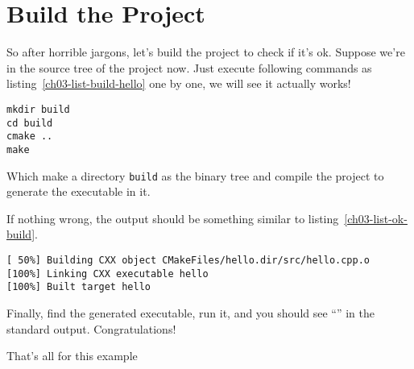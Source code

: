 \section{Build the Project}
So after horrible jargons, let's build the project to check if it's ok. Suppose we're in the source tree of the project now. Just execute following commands as listing~\ref{ch03-list-build-hello} one by one, we will see it actually works!
\begin{lstlisting}[caption={Command to build the project},label=ch03-list-build-hello]
mkdir build
cd build
cmake ..
make
\end{lstlisting}
Which make a directory \texttt{build} as the binary tree and compile the project to generate the executable in it.\par
If nothing wrong, the output should be something similar to listing~\ref{ch03-list-ok-build}. 
\begin{lstlisting}[caption={Successful build},label=ch03-list-ok-build]
[ 50%] Building CXX object CMakeFiles/hello.dir/src/hello.cpp.o
[100%] Linking CXX executable hello
[100%] Built target hello
\end{lstlisting}
Finally, find the generated  executable, run it, and you should see ``'' in the standard output. Congratulations! \par
That's all for this example~
